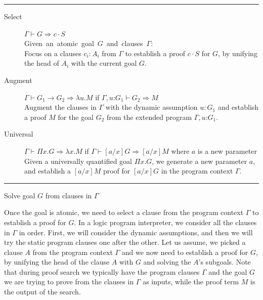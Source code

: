 \documentclass{acmconf}
\newcommand{\figfoot}{\vspace{1ex}\hrule}
\newcommand{\fighead}{\hrule\vspace{1.5ex}}
\newcommand{\vd}{\vdash}
\newcommand{\arrow}{\rightarrow}
\newcommand{\oftp}{\mathord{:}}
\begin{document}
\begin{table}[h]
\fighead
\begin{center}
\begin{small}
\begin{description}
\item[Select] $\Gamma \vd  G \Rightarrow c\cdot S$ \\
    \mbox{Given an atomic goal $G$ and clauses $\Gamma$:}\hfill\\
     Focus on a clauses $c_i : A_i$ from $\Gamma$ to establish a proof
     $c\cdot S$ for $G$, by unifying the head of $A_i$ with the current
     goal $G$. 

\item[Augment] $\Gamma \vd  G_1 \arrow G_2 \Rightarrow \lambda u. M$ if $\Gamma,
  u\oftp G_1 \vd G_2 \Rightarrow M$ \\
Augment the clauses in $\Gamma$ with the dynamic assumption $u : G_1$ and
establish a proof $M$ for the goal $G_2$ from the extended program
$\Gamma, u \oftp G_1$. 
\item[Universal] $\Gamma \vd  \Pi x. G \Rightarrow \lambda x. M$ if $\Gamma \vd
  [a/x]G\Rightarrow [a/x]M$ where $a$ is a new parameter\\
Given a universally quantified goal $\Pi x. G$, we generate a new parameter $a$, and establish a $[a/x]M$ proof  for $[a/x]G$ in the program context $\Gamma$.
\end{description}
  \label{fig:solve}
\end{small}    
\end{center}
\figfoot
\caption{\label{fig:solve}Solve goal $G$ from clauses in $\Gamma$}
\end{table}

Once the goal is atomic, we need to select a clause from the
program context $\Gamma$ to establish a proof for $G$. In a logic
program interpreter, we consider all the clauses in $\Gamma$ in order. 
First, we will consider the dynamic assumptions, and then we will try
the static program clauses one after the other. 
Let us assume, we picked a clause $A$ from the program context
$\Gamma$ and we now need to establish a proof for $G$, by unifying the
head of the clause $A$ with $G$ and solving the $A$'s subgoals.
Note that during proof search we typically have the program
clauses $\Gamma$ and the goal $G$ we are trying to prove from the
clauses in $\Gamma$ as inputs, while the proof term $M$ is the output
of the search. 
\end{document}
